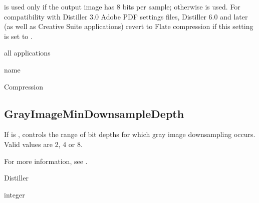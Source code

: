 \documentclass[letterpaper,12pt,english,openany,oneside]{sphinxmanual}
\begin{document}
 is used only if the output image has 8 bits per sample; otherwise  is used. For compatibility with Distiller 3.0 Adobe PDF settings files, Distiller 6.0 and later (as well as Creative Suite applications) revert to Flate compression if this setting is set to  .

\label{\detokenize{PDF_Create_CommonSettings:supported-by-47}}

all applications

\label{\detokenize{PDF_Create_CommonSettings:type-47}}

name

\label{\detokenize{PDF_Create_CommonSettings:ui-name-35}}

Compression

\label{\detokenize{PDF_Create_CommonSettings:default-value-43}}

\begin{sphinxVerbatim}[commandchars=\\\{\}]
\end{sphinxVerbatim}




\subsection{GrayImageMinDownsampleDepth}
\label{\detokenize{PDF_Create_CommonSettings:grayimagemindownsampledepth}}
If  is  , controls the range of bit depths for which gray image downsampling occurs. Valid values are 2, 4 or 8.

For more information, see .

\label{\detokenize{PDF_Create_CommonSettings:supported-by-48}}

Distiller

\label{\detokenize{PDF_Create_CommonSettings:type-48}}

integer

\label{\detokenize{PDF_Create_CommonSettings:default-value-44}}
\end{document}
